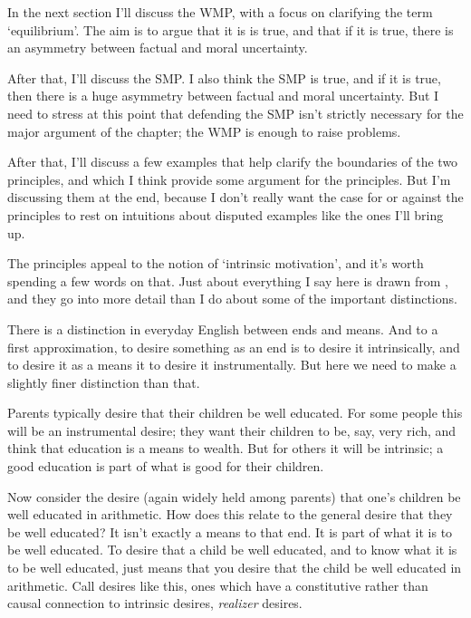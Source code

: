In the next section I'll discuss the WMP, with a focus on clarifying the term `equilibrium'. The aim is to argue that it is is true, and that if it is true, there is an asymmetry between factual and moral uncertainty.

After that, I'll discuss the SMP. I also think the SMP is true, and if it is true, then there is a huge asymmetry between factual and moral uncertainty. But I need to stress at this point that defending the SMP isn't strictly necessary for the major argument of the chapter; the WMP is enough to raise problems.

After that, I'll discuss a few examples that help clarify the boundaries of the two principles, and which I think provide some argument for the principles. But I'm discussing them at the end, because I don't really want the case for or against the principles to rest on intuitions about disputed examples like the ones I'll bring up.

The principles appeal to the notion of `intrinsic motivation', and it's worth spending a few words on that. Just about everything I say here is drawn from \citet[6-14]{ArpalySchroeder2014}, and they go into more detail than I do about some of the important distinctions.

There is a distinction in everyday English between ends and means. And to a first approximation, to desire something as an end is to desire it intrinsically, and to desire it as a means it to desire it instrumentally. But here we need to make a slightly finer distinction than that.

Parents typically desire that their children be well educated. For some people this will be an instrumental desire; they want their children to be, say, very rich, and think that education is a means to wealth. But for others it will be intrinsic; a good education is part of what is good for their children.

Now consider the desire (again widely held among parents) that one's children be well educated in arithmetic. How does this relate to the general desire that they be well educated? It isn't exactly a means to that end. It is part of what it is to be well educated. To desire that a child be well educated, and to know what it is to be well educated, just means that you desire that the child be well educated in arithmetic. Call desires like this, ones which have a constitutive rather than causal connection to intrinsic desires, \emph{realizer} desires.

